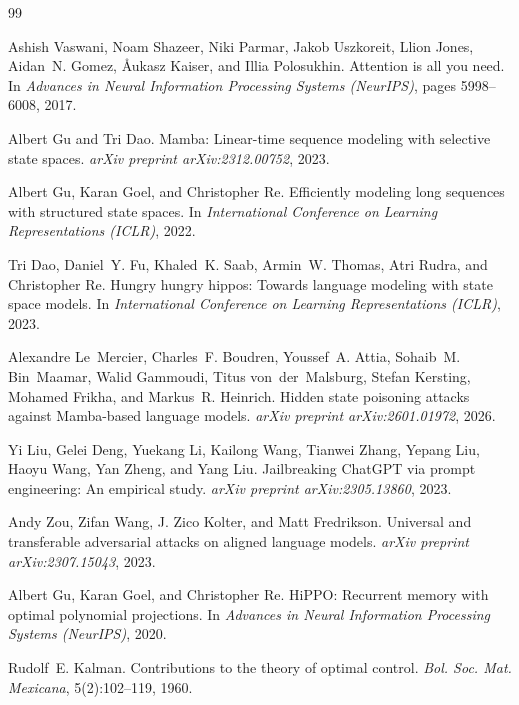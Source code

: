 \documentclass[10pt,twocolumn]{article}
\begin{document}

\begin{thebibliography}{99}

Ashish Vaswani, Noam Shazeer, Niki Parmar, Jakob Uszkoreit, Llion Jones, Aidan~N. Gomez, Åukasz Kaiser, and Illia Polosukhin.
\newblock Attention is all you need.
\newblock In \emph{Advances in Neural Information Processing Systems (NeurIPS)}, pages 5998--6008, 2017.

Albert Gu and Tri Dao.
\newblock Mamba: Linear-time sequence modeling with selective state spaces.
\newblock \emph{arXiv preprint arXiv:2312.00752}, 2023.

Albert Gu, Karan Goel, and Christopher Re.
\newblock Efficiently modeling long sequences with structured state spaces.
\newblock In \emph{International Conference on Learning Representations (ICLR)}, 2022.

Tri Dao, Daniel~Y. Fu, Khaled~K. Saab, Armin~W. Thomas, Atri Rudra, and Christopher Re.
\newblock Hungry hungry hippos: Towards language modeling with state space models.
\newblock In \emph{International Conference on Learning Representations (ICLR)}, 2023.

Alexandre Le~Mercier, Charles~F. Boudren, Youssef~A. Attia, Sohaib~M. Bin~Maamar, Walid Gammoudi, Titus von~der~Malsburg, Stefan Kersting, Mohamed Frikha, and Markus~R. Heinrich.
\newblock Hidden state poisoning attacks against Mamba-based language models.
\newblock \emph{arXiv preprint arXiv:2601.01972}, 2026.

Yi Liu, Gelei Deng, Yuekang Li, Kailong Wang, Tianwei Zhang, Yepang Liu, Haoyu Wang, Yan Zheng, and Yang Liu.
\newblock Jailbreaking ChatGPT via prompt engineering: An empirical study.
\newblock \emph{arXiv preprint arXiv:2305.13860}, 2023.

Andy Zou, Zifan Wang, J. Zico Kolter, and Matt Fredrikson.
\newblock Universal and transferable adversarial attacks on aligned language models.
\newblock \emph{arXiv preprint arXiv:2307.15043}, 2023.

Albert Gu, Karan Goel, and Christopher Re.
\newblock HiPPO: Recurrent memory with optimal polynomial projections.
\newblock In \emph{Advances in Neural Information Processing Systems (NeurIPS)}, 2020.

Rudolf~E. Kalman.
\newblock Contributions to the theory of optimal control.
\newblock \emph{Bol. Soc. Mat. Mexicana}, 5(2):102--119, 1960.


\end{thebibliography}
\end{document}
